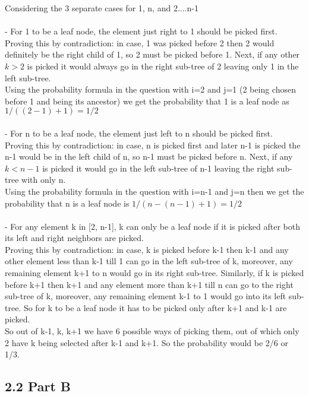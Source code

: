 \documentclass[12pt]{article}
\begin{document}
Considering the 3 separate cases for 1, n, and 2....n-1 \\ \\
- For 1 to be a leaf node, the element just right to 1 should be picked first. \\ Proving this by contradiction: in case, 1 was picked before 2 then 2 would definitely be the right child of 1, so 2 must be picked before 1. Next, if any other \(k>2\) is picked it would always go in the right sub-tree of 2 leaving only 1 in the left sub-tree. \\ Using the probability formula in the question with i=2 and j=1 (2 being chosen before 1 and being its ancestor)  we get the probability that 1 is a leaf node as \(1/((2-1)+1)=1/2\) \\ \\
- For n to be a leaf node, the element just left to n should be picked first.\\ Proving this by contradiction: in case, n is picked first and later n-1 is picked the n-1 would be in the left child of n, so n-1 must be picked before n. Next, if any \(k<n-1\) is picked it would go in the left sub-tree of n-1 leaving the right sub-tree with only n.\\ Using the probability formula in the question with i=n-1 and j=n then we get the probability that n is a leaf node is \(1/(n-(n-1)+1)=1/2\) \\ \\
- For any element k in [2, n-1], k can only be a leaf node if it is picked after both its left and right neighbors are picked.\\ Proving this by contradiction: in case, k is picked before k-1 then k-1 and any other element less than k-1 till 1 can go in the left sub-tree of k, moreover, any remaining element k+1 to n would go in its right sub-tree. Similarly, if k is picked before k+1 then k+1 and any element more than k+1 till n can go to the right sub-tree of k, moreover, any remaining element k-1 to 1 would go into its left sub-tree. So for k to be a leaf node it has to be picked only after k+1 and k-1 are picked.\\ So out of k-1, k, k+1 we have 6 possible ways of picking them, out of which only 2 have k being selected after k-1 and k+1. So the probability would be 2/6 or 1/3.  

\subsection*{2.2 Part B} 
\end{document}

